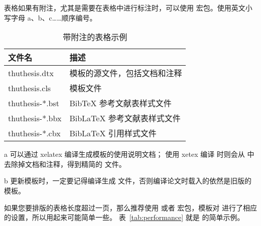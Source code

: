 表格如果有附注，尤其是需要在表格中进行标注时，可以使用  宏包。使用英文小写字母 a、b、c……顺序编号。

\begin{table}
  \centering
  \begin{threeparttable}[c]
    \caption{带附注的表格示例}
    \label{tab:three-part-table}
    \begin{tabular}{ll}
      \toprule
      文件名                 & 描述                         \\
      \midrule
      thuthesis.dtx\tnote{a} & 模板的源文件，包括文档和注释 \\
      thuthesis.cls\tnote{b} & 模板文件                     \\
      thuthesis-*.bst        & BibTeX 参考文献表样式文件    \\
      thuthesis-*.bbx        & BibLaTeX 参考文献表样式文件  \\
      thuthesis-*.cbx        & BibLaTeX 引用样式文件        \\
      \bottomrule
    \end{tabular}
    \begin{tablenotes}
      \item [a] 可以通过 xelatex 编译生成模板的使用说明文档；
        使用 xetex 编译  时则会从  中去除掉文档和注释，得到精简的  文件。
      \item [b] 更新模板时，一定要记得编译生成  文件，否则编译论文时载入的依然是旧版的模板。
    \end{tablenotes}
  \end{threeparttable}
\end{table}


如果您要排版的表格长度超过一页，那么推荐使用  或者 
宏包，模板对  进行了相应的设置，所以用起来可能简单一些。
表~\ref{tab:performance} 就是  的简单示例。

